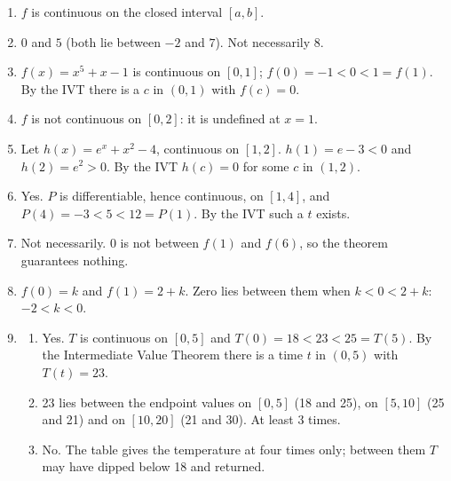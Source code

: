 \documentclass[11pt]{article}
\begin{document}
\newpage
\begin{solbox}
\begin{enumerate}[leftmargin=*,itemsep=4pt]
  \item $f$ is continuous on the closed interval $[a,b]$.
  \item $0$ and $5$ (both lie between $-2$ and $7$). Not necessarily $8$.
  \item $f(x)=x^5+x-1$ is continuous on $[0,1]$; $f(0)=-1<0<1=f(1)$. By the IVT there is a $c$ in $(0,1)$ with $f(c)=0$.
  \item $f$ is not continuous on $[0,2]$: it is undefined at $x=1$.
  \item Let $h(x)=e^x+x^2-4$, continuous on $[1,2]$. $h(1)=e-3<0$ and $h(2)=e^2>0$. By the IVT $h(c)=0$ for some $c$ in $(1,2)$.
  \item Yes. $P$ is differentiable, hence continuous, on $[1,4]$, and $P(4)=-3<5<12=P(1)$. By the IVT such a $t$ exists.
  \item Not necessarily. $0$ is not between $f(1)$ and $f(6)$, so the theorem guarantees nothing.
  \item $f(0)=k$ and $f(1)=2+k$. Zero lies between them when $k<0<2+k$: $-2<k<0$.
  \item \begin{enumerate}[label=(\alph*),leftmargin=*,itemsep=3pt]
    \item Yes. $T$ is continuous on $[0,5]$ and $T(0)=18<23<25=T(5)$. By the Intermediate Value Theorem there is a time $t$ in $(0,5)$ with $T(t)=23$.
    \item 23 lies between the endpoint values on $[0,5]$ (18 and 25), on $[5,10]$ (25 and 21) and on $[10,20]$ (21 and 30). At least $3$ times.
    \item No. The table gives the temperature at four times only; between them $T$ may have dipped below 18 and returned.
  \end{enumerate}
\end{enumerate}
\end{solbox}
\end{document}
